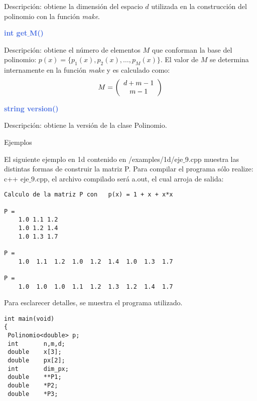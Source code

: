\documentclass[a4paper,11pt]{article}
\begin{document}
{{{{{{{{{\noindent
Descripci\'on: obtiene la dimensi\'on del espacio $d$ utilizada
en la construcci\'on del polinomio con la funci\'on \textit{make}.

\vspace{7mm}
\noindent
{\textcolor{RoyalBlue}{\textbf{ int get$\_$M()  } }

\noindent
Descripci\'on: obtiene el n\'umero de elementos $M$ que conforman
la base del polinomio: $p(x)=\{p_1(x), p_2(x), \ldots, p_M(x)\}$.
El valor de $M$ se determina internamente en la funci\'on \textit{make} y
es calculado como:
\[
M=
\left(
\begin{array}
[c]{c}%
d+m-1\\
m-1
\end{array}
\right)
\]



\vspace{7mm}
\noindent
{\textcolor{RoyalBlue}{ \textbf{string version()  } }

\noindent
Descripci\'on: obtiene la versi\'on de la clase Polinomio.


\newpage
\vspace{3mm}
\noindent
\begin{center}
\begin{Large}
Ejemplos
\end{Large}
\end{center}

El siguiente ejemplo en 1d contenido en /examples/1d/eje$\_$9.cpp muestra las distintas 
formas de construir la matriz P. Para compilar el programa s\'olo realize: c++ $\mbox{eje}\_\mbox{9.cpp}$,
el archivo compilado ser\'a a.out, el cual arroja de salida:
\begin{verbatim}
Calculo de la matriz P con   p(x) = 1 + x + x*x

P = 
    1.0 1.1 1.2 
    1.0 1.2 1.4 
    1.0 1.3 1.7 

P = 
    1.0  1.1  1.2  1.0  1.2  1.4  1.0  1.3  1.7  

P = 
    1.0  1.0  1.0  1.1  1.2  1.3  1.2  1.4  1.7 
\end{verbatim}
Para esclarecer detalles, se muestra el programa utilizado.    
\begin{verbatim}
int main(void)
{ 
 Polinomio<double> p;
 int       n,m,d;
 double    x[3];
 double    px[2];
 int       dim_px;
 double    **P1;
 double    *P2;
 double    *P3;



\end{verbatim}}}}}}}}}}}}
\end{document}
